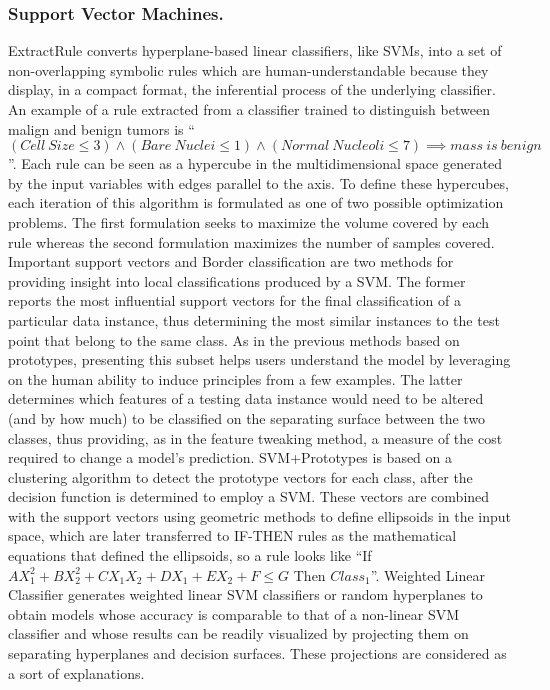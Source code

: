 \documentclass[final,1p,times]{elsarticle}
\begin{document}
\subsubsection{Support Vector Machines.} ExtractRule \cite{fung2005rule} converts hyperplane-based linear classifiers, like SVMs, into a set of non-overlapping symbolic rules which are human-understandable because they display, in a compact format, the inferential process of the underlying classifier. An example of a rule extracted from a classifier trained to distinguish between malign and benign tumors is ``$(Cell\ Size \leq 3) \wedge (Bare\ Nuclei \leq 1) \wedge (Normal\ Nucleoli \leq 7) \implies mass\ is\ benign$''. Each rule can be seen as a hypercube in the multidimensional space generated by the input variables with edges parallel to the axis. To define these hypercubes, each iteration of this algorithm is formulated as one of two possible optimization problems. The first formulation seeks to maximize the volume covered by each rule whereas the second formulation maximizes the number of samples covered.
Important support vectors and Border classification \cite{barbella2009understanding} are two methods for providing insight into local classifications produced by a SVM. The former reports the most influential support vectors for the final classification of a particular data instance, thus determining the most similar instances to the test point that belong to the same class. As in the previous methods based on prototypes, presenting this subset helps users understand the model by leveraging on the human ability to induce principles from a few examples. The latter determines which features of a testing data instance would need to be altered (and by how much) to be classified on the separating surface between the two classes, thus providing, as in the feature tweaking method, a measure of the cost required to change a model's prediction.
SVM+Prototypes \cite{nunez2002rule} is based on a clustering algorithm to detect the prototype vectors for each class, after the decision function is determined to employ a SVM. These vectors are combined with the support vectors using geometric methods to define ellipsoids in the input space, which are later transferred to IF-THEN rules as the mathematical equations that defined the ellipsoids, so a rule looks like ``If $AX_1^2+BX_2^2+CX_1X_2+DX_1+EX_2+F \leq G$ Then $Class_1$''.
Weighted Linear Classifier \cite{caragea2003towards} generates weighted linear SVM classifiers or random hyperplanes to obtain models whose accuracy is comparable to that of a non-linear SVM classifier and whose results can be readily visualized by projecting them on separating hyperplanes and decision surfaces. These projections are considered as a sort of explanations.
\end{document}
